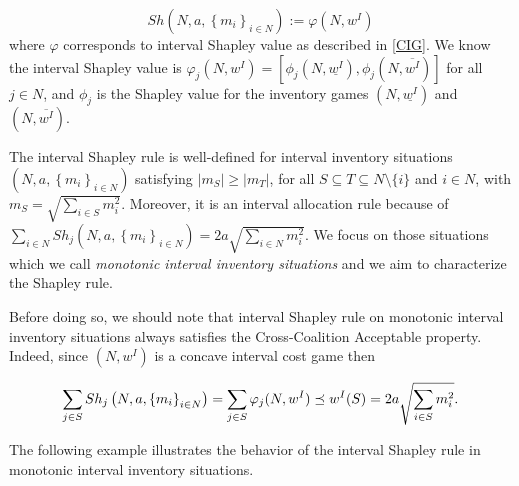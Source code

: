 \documentclass[12pt]{article}
\begin{document}
\begin{equation}  \label{shap}
Sh\left( N,a,\left\{ m_{i}\right\} _{i\in N}\right) :=\varphi(N,w^I)
\end{equation}%
where $\varphi $ corresponds to interval Shapley value as described in \ref{CIG}. We know the interval Shapley value is $\varphi_j(N,w^I)=\left[ \phi_j(N,\underline{w^I}),\phi_j
(N,\overline{w^I})\right] $ for all $j \in N$, and $\phi_j$ is the Shapley value for
the inventory games $(N,\underline{w^I})$ and $(N,\overline{w^I}).$ 
\smallskip

\noindent The interval Shapley rule is well-defined for interval inventory situations $(N,a,\left\{ m_{i}\right\} _{i\in N})$ satisfying $|m_{S}|\geq |m_{T}|$, for all $S\subseteq T\subseteq N\setminus\{i\}$ and  $i\in N$, with $m_S=\sqrt{\sum_{i\in S}m_i^2}$. Moreover, it is an interval allocation rule
because of $\sum_{i\in N} Sh_{j}(N,a,\left\{ m_{i}\right\} _{i\in N})=2a\sqrt{\sum_{i\in N}m_{i}^{2}}$. We focus on those situations which we call \textit{ monotonic interval inventory situations} and we aim to characterize the Shapley rule. 


Before doing so, we should note that interval Shapley rule on monotonic interval inventory situations always satisfies the Cross-Coalition Acceptable property. Indeed, since $(N,w^{I})$ is a concave interval cost game then 

$$\sum_{j\in S}Sh_{j}\left(N,a,\left\{ m_{i}\right\} _{i\in
N}\right) = \sum_{j\in S}\varphi _{j}(N,w^{I}%
)\preceq w^{I}(S)=2a\sqrt{%
\sum_{i\in S}m_{i}^{2}}.$$

The following example illustrates the behavior of the interval Shapley rule in monotonic interval inventory situations.
\end{document}
